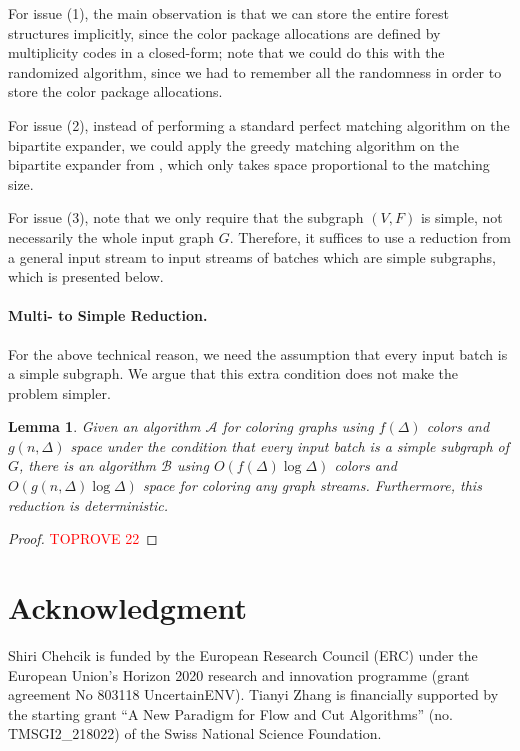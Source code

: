 \documentclass[11pt,a4paper]{article}
\newtheorem{lemma}{Lemma}[section]
\begin{document}
For issue (1), the main observation is that we can store the entire forest structures implicitly, since the color package allocations are defined by multiplicity codes in a closed-form; note that we could do this with the randomized algorithm, since we had to remember all the randomness in order to store the color package allocations.

For issue (2), instead of performing a standard perfect matching algorithm on the bipartite expander, we could apply the greedy matching algorithm on the bipartite expander from , which only takes space proportional to the matching size.

For issue (3), note that we only require that the subgraph $(V, F)$ is simple, not necessarily the whole input graph $G$. Therefore, it suffices to use a reduction from a general input stream to input streams of batches which are simple subgraphs, which is presented below.

\paragraph*{Multi- to Simple Reduction.} For the above technical reason, we need the assumption that every input batch is a simple subgraph. We argue that this extra condition does not make the problem simpler.
\begin{lemma}
	Given an algorithm $\mathcal{A}$ for coloring graphs using $f(\Delta)$ colors and $g(n, \Delta)$ space under the condition that every input batch is a simple subgraph of $G$, there is an algorithm $\mathcal{B}$ using $O(f(\Delta)\log\Delta)$ colors and $O(g(n, \Delta)\log\Delta)$ space for coloring any graph streams. Furthermore, this reduction is deterministic.
\end{lemma}
\begin{proof}\textcolor{red}{TOPROVE 22}\end{proof} 
\section*{Acknowledgment}
Shiri Chehcik is funded by the European Research Council (ERC) under the European Union’s Horizon 2020 research and innovation programme (grant agreement No 803118 UncertainENV). Tianyi Zhang is financially supported by the starting grant ``A New Paradigm for Flow and Cut Algorithms'' (no. TMSGI2\_218022) of the Swiss National Science Foundation.


\vspace{5mm}


\end{document}
